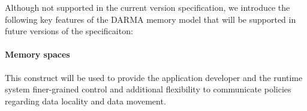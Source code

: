 




Although not supported in the current version specification, we introduce the
following key features of the DARMA memory model that will be supported in future versions
of the specificaiton:

\paragraph{Memory spaces} This
  construct will be used to provide the application developer and the runtime
  system finer-grained control and additional flexibility to communicate
  policies regarding data locality and data movement. 






